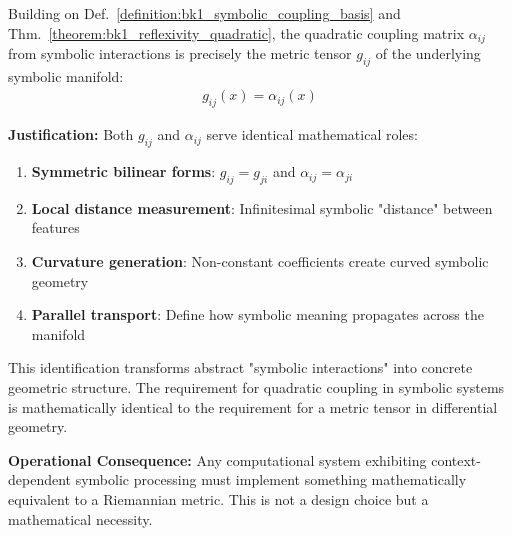 \begin{proposition}
\label{proposition:bk1_bridge_to_geometry}
Building on Def.~\ref{definition:bk1_symbolic_coupling_basis} and Thm.~\ref{theorem:bk1_reflexivity_quadratic}, the quadratic coupling matrix $\alpha_{ij}$ from symbolic interactions is precisely the metric tensor $g_{ij}$ of the underlying symbolic manifold:
\begin{align}
g_{ij}(x) = \alpha_{ij}(x)
\end{align}

\textbf{Justification:} Both $g_{ij}$ and $\alpha_{ij}$ serve identical mathematical roles:
\begin{enumerate}
\item \textbf{Symmetric bilinear forms}: $g_{ij} = g_{ji}$ and $\alpha_{ij} = \alpha_{ji}$
\item \textbf{Local distance measurement}: Infinitesimal symbolic "distance" between features
\item \textbf{Curvature generation}: Non-constant coefficients create curved symbolic geometry
\item \textbf{Parallel transport}: Define how symbolic meaning propagates across the manifold
\end{enumerate}

This identification transforms abstract "symbolic interactions" into concrete geometric structure. The requirement for quadratic coupling in symbolic systems is mathematically identical to the requirement for a metric tensor in differential geometry.

\textbf{Operational Consequence:} Any computational system exhibiting context-dependent symbolic processing must implement something mathematically equivalent to a Riemannian metric. This is not a design choice but a mathematical necessity.
\end{proposition}
